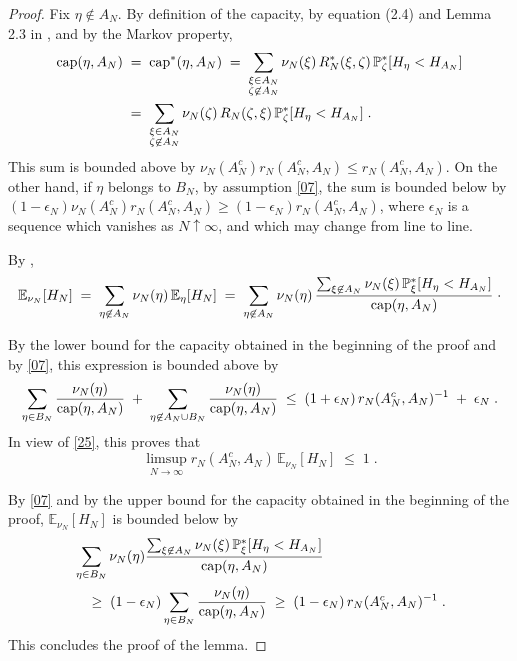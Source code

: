 \documentclass[reqno]{amsart}
\begin{document}
\begin{proof}
Fix $\eta\not\in A_N$.  By definition of the capacity, by equation
(2.4) and Lemma 2.3 in \cite{gl2}, and by the Markov property,
\begin{equation*}
\begin{split}
{{\rm cap}} (\eta, A_N) \;&=\; {{\rm cap}}^* (\eta, A_N) \;=\; 
\sum_{\substack{\xi\in A_N \\ \zeta\not\in
    A_N}} \nu_N(\xi)\, R^*_N(\xi,\zeta) \, {{\mathbb P}}^*_{\zeta}[H_\eta <
H_{A_N}] \\
&=\; \sum_{\substack{\xi\in A_N \\ \zeta\not\in
    A_N}} \nu_N(\zeta)\, R_N(\zeta, \xi) \, {{\mathbb P}}^*_{\zeta}[H_\eta <
H_{A_N}] \;. 
\end{split}
\end{equation*}
This sum is bounded above by $\nu_N(A_N^c) r_N(A_N^c, A_N) \le
r_N(A_N^c, A_N)$. On the other hand, if $\eta$ belongs to $B_N$, by
assumption \eqref{07}, the sum is bounded below by $(1-\epsilon_N)
\nu_N(A_N^c) r_N(A_N^c, A_N) \ge (1-\epsilon_N) r_N(A_N^c, A_N)$,
where $\epsilon_N$ is a sequence which vanishes as $N\uparrow\infty$,
and which may change from line to line.

By \cite[Proposition A.2]{bl7}, 
\begin{equation*}
{{\mathbb E}}_{\nu_N} [H_N] 
\;=\; \sum_{\eta\not\in A_N} \nu_N(\eta) \, {{\mathbb E}}_{\eta} [H_N]
\;=\; \sum_{\eta\not\in A_N} \nu_N(\eta) \,
\frac{\sum_{\xi\not\in A_N} \nu_N(\xi) \, {{\mathbb P}}^*_{\xi} [ H_\eta < H_{A_N}]}
{{{\rm cap}} (\eta, A_N)}\;\cdot
\end{equation*}

By the lower bound for the capacity obtained in the beginning of the
proof and by \eqref{07}, this expression is bounded above by
\begin{equation*}
\sum_{\eta\in B_N} \frac{\nu_N(\eta)} {{{\rm cap}} (\eta, A_N)}
\;+\; \sum_{\eta\not\in A_N\cup B_N} \frac{\nu_N(\eta)} {{{\rm cap}} (\eta,
  A_N)} \;\le\; (1+\epsilon_N) \, r_N(A_N^c, A_N)^{-1}
\;+\; \epsilon_N\;.
\end{equation*}
In view of \eqref{25}, this proves that
\begin{equation*}
\limsup_{N\to\infty} r_N(A_N^c, A_N)\, {{\mathbb E}}_{\nu_N} [H_N]  \;\le\; 1\;.
\end{equation*}

By \eqref{07} and by the upper bound for the capacity obtained in the
beginning of the proof, ${{\mathbb E}}_{\nu_N} [H_N]$ is bounded below by
\begin{equation*}
\begin{split}
& \sum_{\eta\in B_N} \nu_N(\eta)
\frac{\sum_{\xi\not\in A_N} \nu_N(\xi) \, {{\mathbb P}}^*_{\xi} 
[ H_\eta < H_{A_N}]} {{{\rm cap}} (\eta, A_N)} \\
&\quad \ge\;
(1-\epsilon_N) \sum_{\eta\in B_N} 
\frac{\nu_N(\eta)} {{{\rm cap}} (\eta, A_N)}\;\ge\;
(1-\epsilon_N) \,  r_N(A_N^c, A_N)^{-1} \;.  
\end{split}
\end{equation*}
This concludes the proof of the lemma.
\end{proof}
\end{document}

